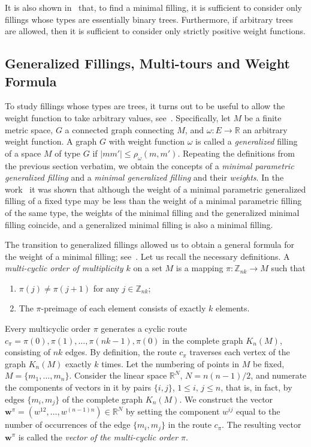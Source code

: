 \documentclass[10pt]{article}
\theoremstyle{plain}
\theoremstyle{definition}
\def\bw{\boldsymbol{w}}
\def\:{\colon}
\def\om{\omega}
\newcommand{\R}{{\mathbb R}}
\newcommand{\Z}{{\mathbb Z}}
\begin{document}
It is also shown in~\cite{IT_MSb} that, to find a minimal filling, it is sufficient to consider only fillings whose types are essentially binary trees. Furthermore, if arbitrary trees are allowed, then it is sufficient to consider only strictly positive weight functions.

\subsection{Generalized Fillings, Multi-tours and Weight Formula}
To study fillings whose types are trees, it turns out to be useful to allow the weight function to take arbitrary values, see~\cite{IOST}. Specifically, let $M$ be a finite metric space, $G$ a connected graph connecting $M$, and $\om\:E\to\R$ an arbitrary weight function. A graph $G$ with weight function $\om$ is called a \emph{generalized\/} filling of a space $M$ of type $G$ if $|mm'|\le\rho_\om(m,m')$. Repeating the definitions from the previous section verbatim, we obtain the concepts of a \emph{minimal parametric generalized filling\/} and a \emph{minimal generalized filling\/} and their \emph{weights}. In the work~\cite{IOST} it was shown that although the weight of a minimal parametric generalized filling of a fixed type may be less than the weight of a minimal parametric filling of the same type, the weights of the minimal filling and the generalized minimal filling coincide, and a generalized minimal filling is also a minimal filling.

The transition to generalized fillings allowed us to obtain a general formula for the weight of a minimal filling; see~\cite{Eremin}. Let us recall the necessary definitions. A \emph{multi-cyclic order of multiplicity $k$\/} on a set $M$ is a mapping $\pi\:\Z_{nk}\to M$ such that
\begin{enumerate}
\item $\pi(j)\ne\pi(j+1)$ for any $j\in\Z_{nk}$;
\item The $\pi$-preimage of each element consists of exactly $k$ elements.
\end{enumerate}

Every multicyclic order $\pi$ generates a cyclic route $c_\pi=\pi(0),\pi(1),\ldots,\pi(nk-1),\pi(0)$ in the complete graph $K_n(M)$, consisting of $nk$ edges. By definition, the route $c_\pi$ traverses each vertex of the graph $K_n(M)$ exactly $k$ times. Let the numbering of points in $M$ be fixed, $M=\{m_1,\ldots,m_n\}$. Consider the linear space $\R^N$, $N=n(n-1)/2$, and numerate the components of vectors in it by pairs $\{i,j\}$, $1\le i,\, j\le n$, that is, in fact, by edges $\{m_i,m_j\}$ of the complete graph $K_n(M)$. We construct the vector $\bw^{\pi}=(w^{12},\ldots, w^{(n-1)n})\in \R^N$ by setting the component $w^{ij}$ equal to the number of occurrences of the edge $\{m_i,m_j\}$ in the route $c_\pi$. The resulting vector $\bw^{\pi}$ is called the \emph{vector of the multi-cyclic order $\pi$}.
\end{document}
